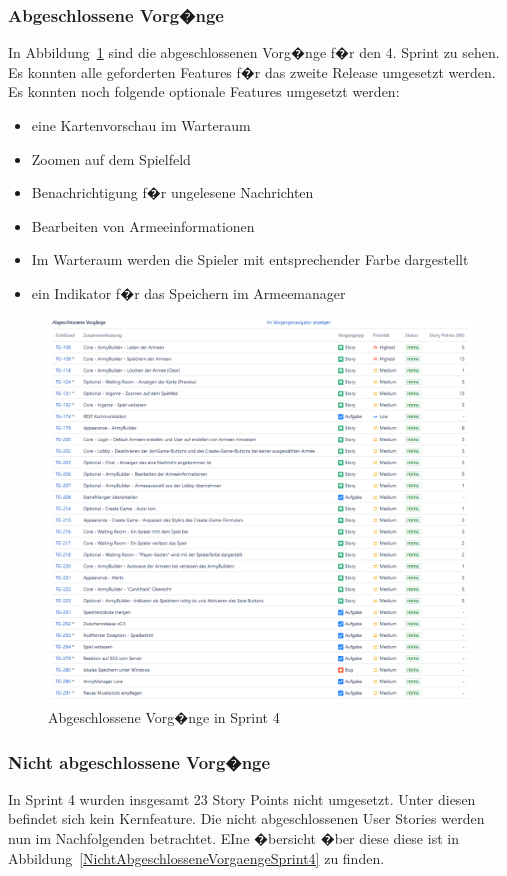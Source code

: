 \documentclass[12pt, titlepage]{scrartcl}
\newcommand{\Abb}[1]{%
	Abbildung\ \ref{#1}%
}
\begin{document}
			\subsubsection{Abgeschlossene Vorg�nge}	
			In \Abb{AbgeschlosseneVorgaengeSprint4} sind die abgeschlossenen Vorg�nge f�r den 4. Sprint zu sehen. Es konnten alle geforderten Features f�r das zweite Release umgesetzt werden. Es konnten noch folgende optionale Features umgesetzt werden:
			\begin{itemize}
				\item eine Kartenvorschau im Warteraum
				\item Zoomen auf dem Spielfeld
				\item Benachrichtigung f�r ungelesene Nachrichten
				\item Bearbeiten von Armeeinformationen
				\item Im Warteraum werden die Spieler mit entsprechender Farbe dargestellt
				\item ein Indikator f�r das Speichern im Armeemanager
			\end{itemize}
			\begin{figure}[H] 
				\centering
				\includegraphics[width=1\textwidth]{Abschlossene_Vorgaenge_Sprint_4.png}
				\caption{Abgeschlossene Vorg�nge in Sprint 4}
				\label{AbgeschlosseneVorgaengeSprint4}
			\end{figure}
			
			\subsubsection{Nicht abgeschlossene Vorg�nge}
			In Sprint 4 wurden insgesamt 23 Story Points nicht umgesetzt. Unter diesen befindet sich kein Kernfeature. Die nicht abgeschlossenen User Stories werden nun im Nachfolgenden betrachtet. EIne �bersicht �ber diese diese ist in \Abb{NichtAbgeschlosseneVorgaengeSprint4} zu finden.
			
\end{document}
